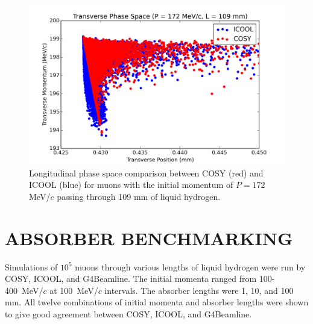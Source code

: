 \documentclass[a4paper,11pt]{article}
\begin{document}
\begin{figure}[htb]
\centering
\includegraphics[width=\columnwidth]{tof}
\caption{Longitudinal phase space comparison between COSY (red) and ICOOL (blue) for muons with the initial momentum of $P=172$ MeV/$c$ passing through 109 mm of liquid hydrogen.}
\label{fig:tof}
\end{figure}






\fi



\section{ABSORBER BENCHMARKING}
Simulations of $10^5$ muons through various lengths of liquid hydrogen were run by COSY, ICOOL, and G4Beamline. The initial momenta ranged from 100-400~MeV/$c$ at 100~MeV/$c$ intervals. The absorber lengths were 1, 10, and 100 mm. All twelve combinations of initial momenta and absorber lengths were shown to give good agreement between COSY, ICOOL, and G4Beamline.
\end{document}
